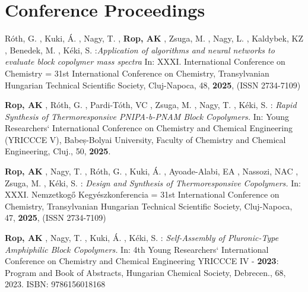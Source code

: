 \section{Conference Proceedings}
\begin{etaremune}
	\item
	Róth, G. ,  Kuki, Á. ,  Nagy, T. ,  {\bf Rop, AK} ,  Zsuga, M. ,  Nagy, L. ,   Kaldybek, KZ ,  Benedek, M. ,  Kéki, S. :{\it Application of algorithms and neural networks to evaluate block copolymer mass spectra}
	In: XXXI. International Conference on Chemistry = 31st International Conference on Chemistry, Transylvanian Hungarian Technical Scientific Society, Cluj-Napoca, 48, {\bf 2025}, (ISSN 2734-7109)
	\item 
	{\bf Rop, AK} , Róth, G. , Pardi-Tóth, VC , Zsuga, M. , Nagy, T. , Kéki, S. : {\it Rapid Synthesis of Thermoresponsive PNIPA-b-PNAM Block Copolymers.}
	In: Young Researchers` International Conference on Chemistry and Chemical Engineering (YRICCCE V), Babeș-Bolyai University, Faculty of Chemistry and Chemical Engineering, Cluj.,  50, {\bf 2025}.
	\item 
	{\bf Rop, AK }, Nagy, T. , Róth, G. , Kuki, Á. , Ayoade-Alabi, EA , Nassozi, NAC , Zsuga, M. , Kéki, S. : {\it Design and Synthesis of Thermoresponsive Copolymers.}
	In: XXXI. Nemzetkogő Kegyészkonferencia = 31st International Conference on Chemistry, Transylvanian Hungarian Technical Scientific Society, Cluj-Napoca, 47, {\bf 2025}, (ISSN 2734-7109)
	\item 
	{\bf Rop, AK} , Nagy, T. , Kuki, Á. , Kéki, S. : {\it Self-Assembly of Pluronic-Type Amphiphilic Block Copolymers.}
	In: 4th Young Researchers` International Conference on Chemistry and Chemical Engineering YRICCCE IV - {\bf 2023}: Program and Book of Abstracts, Hungarian Chemical Society, Debrecen., 68, 2023. ISBN: 9786156018168
\end {etaremune}

